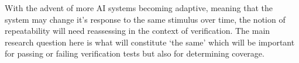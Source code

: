 \documentclass[letterpaper, 10 pt, journal, twoside]{IEEEtran}
\begin{document}
With the advent of more AI systems becoming adaptive, meaning that the system may change it's response to the same stimulus over time, the notion of repeatability will need reassessing in the context of verification. The main research question here is what will constitute `the same' which will be important for passing or failing verification tests but also for determining coverage. 






\end{document}
